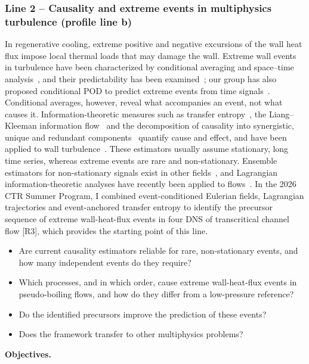 \documentclass[11pt]{article}
\begin{document}
\subsubsection*{Line 2 -- Causality and extreme events in multiphysics turbulence (profile
line b)}
In regenerative cooling, extreme positive and negative excursions of the wall heat flux
impose local thermal loads that may damage the wall. Extreme wall events in turbulence have
been characterized by conditional averaging and space--time
analysis~\cite{Guerrero2020,Hack2021,Zhang2023}, and their predictability has been
examined~\cite{Blonigan2019}; our group has also proposed conditional POD to predict extreme
events from time signals~\cite{Martin2025}. Conditional averages, however, reveal what
accompanies an event, not what causes it. Information-theoretic measures such as transfer
entropy~\cite{Schreiber2000}, the Liang--Kleeman information flow~\cite{Liang2005} and the
decomposition of causality into synergistic, unique and redundant
components~\cite{MartinezSanchez2024} quantify cause and effect, and have been applied to
wall turbulence~\cite{LozanoDuran2020,Massaro2023,Zhang2026}. These estimators usually
assume stationary, long time series, whereas extreme events are rare and non-stationary.
Ensemble estimators for non-stationary signals exist in other fields~\cite{Wollstadt2014},
and Lagrangian information-theoretic analyses have recently been applied to
flows~\cite{Jiang2027}. In the 2026 CTR Summer Program, I combined event-conditioned
Eulerian fields, Lagrangian trajectories and event-anchored transfer entropy to identify the
precursor sequence of extreme wall-heat-flux events in four DNS of transcritical channel
flow [R3], which provides the starting point of this line.
\begin{itemize}
  \item[\textbf{Q2.1}] Are current causality estimators reliable for rare, non-stationary
  events, and how many independent events do they require?
  \item[\textbf{Q2.2}] Which processes, and in which order, cause extreme wall-heat-flux
  events in pseudo-boiling flows, and how do they differ from a low-pressure reference?
  \item[\textbf{Q2.3}] Do the identified precursors improve the prediction of these events?
  \item[\textbf{Q2.4}] Does the framework transfer to other multiphysics problems?
\end{itemize}
\textbf{Objectives.}
\end{document}
